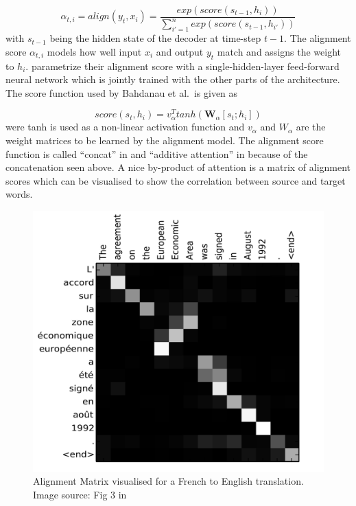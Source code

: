 \documentclass[]{krantz}
\begin{document}
\[
\alpha_{t,i} = align(y_t, x_i) =\frac{exp(score(s_{t-1},h_i))}{\sum^{n}_{i'=1}exp(score(s_{t-1},h_{i'}))}
\]
with \(s_{t-1}\) being the hidden state of the decoder at time-step \(t-1\).
The alignment score \(\alpha_{t,i}\) models how well input \(x_i\) and output \(y_t\) match
and assigns the weight to \(h_i\). \citet{bahdanau2014neural} parametrize their alignment
score with a single-hidden-layer feed-forward neural network which is jointly
trained with the other parts of the architecture. The score function used by Bahdanau et
al.~is given as

\[
score(s_t,h_i) = v_\alpha^Ttanh(\mathbf{W}_\alpha[s_t;h_i])
\]
were tanh is used as a non-linear activation function and \(v_\alpha\) and \(W_\alpha\)
are the weight matrices to be learned by the alignment model. The alignment score function
is called ``concat'' in \citet{luong2015effective} and ``additive attention'' in \citet{vaswani2017attention}
because of the concatenation seen above. A nice by-product of attention is a matrix of alignment scores
which can be visualised to show the correlation between source and target words.

\begin{figure}
\centering
\includegraphics{./figures/02-02-attention-and-self-attention-for-nlp/bahdanau-fig3.png}
\caption{Alignment Matrix visualised for a French to English translation. Image source: Fig 3 in \citet{bahdanau2014neural}}
\end{figure}
\end{document}
